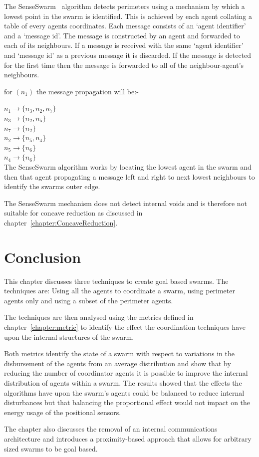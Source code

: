 The SenseSwarm~\cite{ZAPS:07, APZDAMC:09, AZDPS:11} algorithm detects perimeters using a mechanism by which a lowest point in the swarm is identified. This is achieved by each agent collating a table of every agents coordinates. Each message consists of an `agent identifier' and a `message id'. The message is constructed by an agent and forwarded to each of its neighbours. If a message is received with the same `agent identifier' and `message id' as a previous message it is discarded. If the message is detected for the first time then the message is forwarded to all of the neighbour-agent's neighbours.

for $(n_1)$ the message propagation will be:-

$n_1 \to \{n_3, n_2, n_7\}$ \\
$n_3 \to \{n_2, n_5\}$\\
$n_7 \to \{n_2\}$\\
$n_2 \to \{n_5, n_4\}$\\
$n_5 \to \{n_6\}$\\
$n_4 \to \{n_6\}$\\

The SenseSwarm algorithm works by locating the lowest agent in the swarm and then that agent propagating a message left and right to next lowest neighbours to identify the swarms outer edge. 

The SenseSwarm mechanism does not detect internal voids and is therefore not suitable for concave reduction as discussed in chapter~\ref{chapter:ConcaveReduction}.

\section{Conclusion\label{methods:Conclusion}}

This chapter discusses three techniques to create goal based swarms. The techniques are: Using all the agents to coordinate a swarm, using perimeter agents only and using a subset of the perimeter agents. 

The techniques are then analysed using the metrics defined in chapter~\ref{chapter:metric} to identify the effect the coordination techniques have upon the internal structures of the swarm.

Both metrics identify the state of a swarm with respect to variations in the disbursement of the agents from an average distribution and show that by reducing the number of coordinator agents it is possible to improve the internal distribution of agents within a swarm. The results showed that the effects the algorithms have upon the swarm's agents could be balanced to reduce internal disturbances but that balancing the proportional effect would not impact on the energy usage of the positional sensors. 

The chapter also discusses the removal of an internal communications architecture and introduces a proximity-based approach that allows for arbitrary sized swarms to be goal based. 

